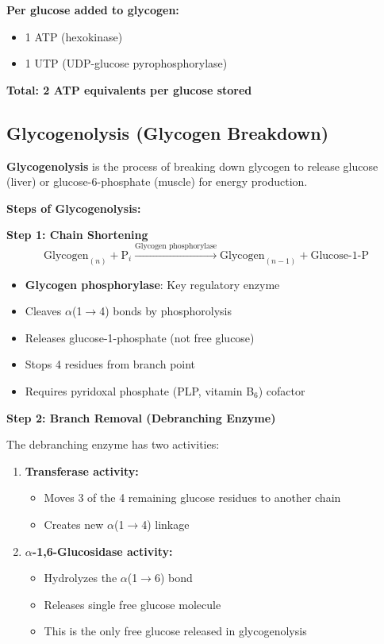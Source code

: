 \begin{tcolorbox}[colback=green!5, colframe=green!70!black, title=\textbf{Energy Cost of Glycogenesis}]
\textbf{Per glucose added to glycogen:}
\begin{itemize}
    \item 1 ATP (hexokinase)
    \item 1 UTP (UDP-glucose pyrophosphorylase)
\end{itemize}
\textbf{Total: 2 ATP equivalents per glucose stored}
\end{tcolorbox}

\subsection{Glycogenolysis (Glycogen Breakdown)}

\begin{definition}
\textbf{Glycogenolysis} is the process of breaking down glycogen to release glucose (liver) or glucose-6-phosphate (muscle) for energy production.
\end{definition}

\textbf{Steps of Glycogenolysis:}

\textbf{Step 1: Chain Shortening}
\[
\text{Glycogen}_{(n)} + \text{P}_i \xrightarrow{\text{Glycogen phosphorylase}} \text{Glycogen}_{(n-1)} + \text{Glucose-1-P}
\]
\begin{itemize}
    \item \textbf{Glycogen phosphorylase}: Key regulatory enzyme
    \item Cleaves $\alpha$(1$\rightarrow$4) bonds by phosphorolysis
    \item Releases glucose-1-phosphate (not free glucose)
    \item Stops 4 residues from branch point
    \item Requires pyridoxal phosphate (PLP, vitamin B$_6$) cofactor
\end{itemize}

\textbf{Step 2: Branch Removal (Debranching Enzyme)}

The debranching enzyme has two activities:

\begin{enumerate}
    \item \textbf{Transferase activity:}
    \begin{itemize}
        \item Moves 3 of the 4 remaining glucose residues to another chain
        \item Creates new $\alpha$(1$\rightarrow$4) linkage
    \end{itemize}
    
    \item \textbf{$\alpha$-1,6-Glucosidase activity:}
    \begin{itemize}
        \item Hydrolyzes the $\alpha$(1$\rightarrow$6) bond
        \item Releases single free glucose molecule
        \item This is the only free glucose released in glycogenolysis
    \end{itemize}
\end{enumerate}


